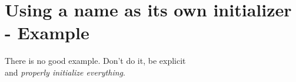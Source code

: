 \documentclass{article}
\begin{document}
 \section*{Using a name as its own initializer \-- Example}
 There is no good example. Don't do it,  be explicit \\and \textsl{properly initialize everything}.
 
\end{document}
